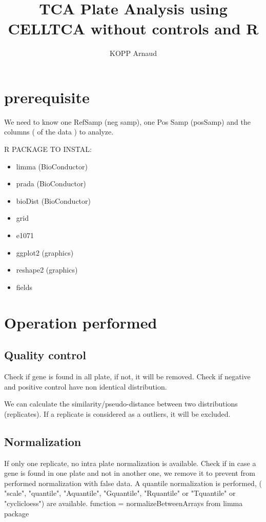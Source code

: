 \documentclass[a4paper,10pt]{article}
\author{KOPP Arnaud}
\title {TCA Plate Analysis using CELLTCA without controls and R}
\begin{document}
\maketitle


\section*{prerequisite}
We need to know one RefSamp (neg samp), one Pos Samp (posSamp) and the columns ( of the data ) to analyze.

\bigskip

R PACKAGE TO INSTAL:
\begin{itemize}
  \item limma (BioConductor)
  \item prada (BioConductor)
  \item bioDist (BioConductor)
  \item grid
  \item e1071
  \item ggplot2 (graphics)
  \item reshape2 (graphics)
  \item fields
\end{itemize}

\section*{Operation performed}

\subsection*{Quality control}
Check if gene is found in all plate, if not, it will be removed.
Check if negative and positive control have non identical distribution.

We can calculate the similarity/pseudo-distance between two distributions (replicates). If a replicate is considered as a 
outliers, it will be excluded. 

\subsection*{Normalization}
If only one replicate, no intra plate normalization is available. Check if in case a gene is found in one plate and not
 in another one, we remove it to prevent from performed normalization with false data.
A quantile normalization is performed, ( "scale", "quantile", "Aquantile", "Gquantile", "Rquantile" or "Tquantile" 
or "cyclicloess") are available. function = normalizeBetweenArrays from limma package
\end{document}
